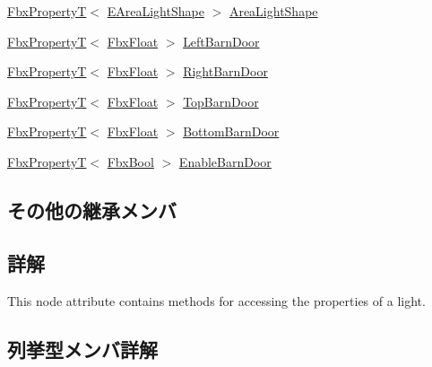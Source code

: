 \begin{DoxyCompactItemize}
\item 
\hyperlink{class_fbx_property_t}{Fbx\+PropertyT}$<$ \hyperlink{class_fbx_light_a9bc60eabc41255f46f35d1f6acd274cd}{E\+Area\+Light\+Shape} $>$ \hyperlink{class_fbx_light_a2d2ad2128f1ae61151c15d7de259d2e8}{Area\+Light\+Shape}
\item 
\hyperlink{class_fbx_property_t}{Fbx\+PropertyT}$<$ \hyperlink{fbxtypes_8h_aef968e37f2ddc4188de464d8578c1d5c}{Fbx\+Float} $>$ \hyperlink{class_fbx_light_afcf3b7db2cad32e11bb6fa016a402bc7}{Left\+Barn\+Door}
\item 
\hyperlink{class_fbx_property_t}{Fbx\+PropertyT}$<$ \hyperlink{fbxtypes_8h_aef968e37f2ddc4188de464d8578c1d5c}{Fbx\+Float} $>$ \hyperlink{class_fbx_light_aea237e743f2b2e2d5a2e3cdf28a78290}{Right\+Barn\+Door}
\item 
\hyperlink{class_fbx_property_t}{Fbx\+PropertyT}$<$ \hyperlink{fbxtypes_8h_aef968e37f2ddc4188de464d8578c1d5c}{Fbx\+Float} $>$ \hyperlink{class_fbx_light_a22b02c12b00c38da4d38a21876ec5340}{Top\+Barn\+Door}
\item 
\hyperlink{class_fbx_property_t}{Fbx\+PropertyT}$<$ \hyperlink{fbxtypes_8h_aef968e37f2ddc4188de464d8578c1d5c}{Fbx\+Float} $>$ \hyperlink{class_fbx_light_aef1e933e3a3baea5ad804868750cbd04}{Bottom\+Barn\+Door}
\item 
\hyperlink{class_fbx_property_t}{Fbx\+PropertyT}$<$ \hyperlink{fbxtypes_8h_a92e0562b2fe33e76a242f498b362262e}{Fbx\+Bool} $>$ \hyperlink{class_fbx_light_add61baef63184934eeb71ede6328354c}{Enable\+Barn\+Door}
\end{DoxyCompactItemize}
\subsection*{その他の継承メンバ}


\subsection{詳解}
This node attribute contains methods for accessing the properties of a light. 

\subsection{列挙型メンバ詳解}
\mbox{\label{class_fbx_light_a9bc60eabc41255f46f35d1f6acd274cd}} 

